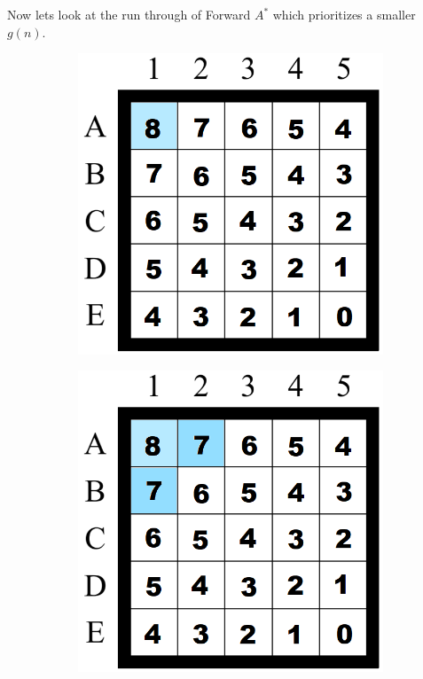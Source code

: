 Now lets look at the run through of {Forward $A^*$} which prioritizes a smaller $g(n)$.
\linebreak
\begin{figure}[H]
\begin{subfigure}[b]{.3\textwidth}
  \centering
  \includegraphics[width=0.95\linewidth]{Report/Part2/g tie breaker/smaller g/1.png}  
\end{subfigure}
\begin{subfigure}[b]{.3\textwidth}
  \centering
  \includegraphics[width=0.95\linewidth]{Report/Part2/g tie breaker/smaller g/2.png}  

\end{subfigure}
\end{figure}
